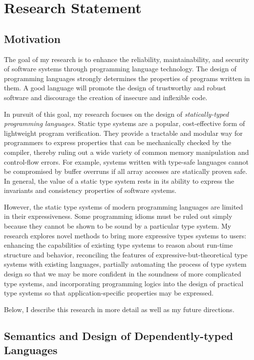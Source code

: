 \documentclass[]{article}
\author{}
\date{}
\begin{document}
\section{Research Statement}

\subsection{Motivation}

The goal of my research is to enhance the reliability, maintainability,
and security of software systems through programming language
technology. The design of programming languages strongly determines the
properties of programs written in them. A good language will promote the
design of trustworthy and robust software and discourage the creation of
insecure and inflexible code.

In pursuit of this goal, my research focuses on the design of
\emph{statically-typed programming languages.} Static type systems are a
popular, cost-effective form of lightweight program verification. They
provide a tractable and modular way for programmers to express
properties that can be mechanically checked by the compiler, thereby
ruling out a wide variety of common memory manipulation and control-flow
errors. For example, systems written with type-safe languages cannot be
compromised by buffer overruns if all array accesses are statically
proven safe. In general, the value of a static type system rests in its
ability to express the invariants and consistency properties of software
systems.

However, the static type systems of modern programming languages are
limited in their expressiveness. Some programming idioms must be ruled
out simply because they cannot be shown to be sound by a particular type
system. My research explores novel methods to bring more expressive
types systems to users: enhancing the capabilities of existing type
systems to reason about run-time structure and behavior, reconciling the
features of expressive-but-theoretical type systems with existing
languages, partially automating the process of type system design so
that we may be more confident in the soundness of more complicated type
systems, and incorporating programming logics into the design of
practical type systems so that application-specific properties may be
expressed.

Below, I describe this research in more detail as well as my future
directions.

\subsection{Semantics and Design of Dependently-typed Languages}
\end{document}
